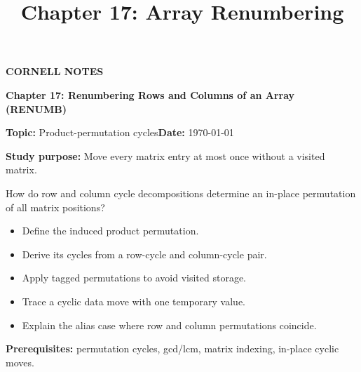 \documentclass[10pt,letterpaper]{article}
\title{Chapter 17: Array Renumbering}
\author{}
\date{}
\begin{document}
\maketitle
\begin{tcolorbox}[colback=Paper,colframe=Ink]{\small\bfseries\color{Teal}CORNELL NOTES}\par{\LARGE\bfseries Chapter 17: Renumbering Rows and Columns of an Array (RENUMB)}\par\medskip\textbf{Topic:} Product-permutation cycles\hfill\textbf{Date:} \today\par\textbf{Study purpose:} Move every matrix entry at most once without a visited matrix.\end{tcolorbox}
\begin{tcolorbox}[colback=Teal!5,colframe=Teal,title=Essential question]How do row and column cycle decompositions determine an in-place permutation of all matrix positions?\end{tcolorbox}
\begin{tcolorbox}[colback=white,colframe=Mist,title=Learning objectives]\begin{itemize}\item Define the induced product permutation.\item Derive its cycles from a row-cycle and column-cycle pair.\item Apply tagged permutations to avoid visited storage.\item Trace a cyclic data move with one temporary value.\item Explain the alias case where row and column permutations coincide.\end{itemize}\textbf{Prerequisites:} permutation cycles, gcd/lcm, matrix indexing, in-place cyclic moves.\end{tcolorbox}
\end{document}

